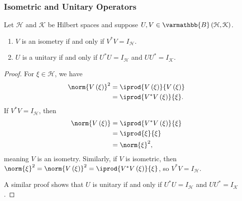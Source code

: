 \documentclass[10pt]{mypackage}
\renewcommand*{\mathbb}[1]{\varmathbb{#1}}
\newcommand{\B}{\mathbb{B}}
\begin{document}
\subsubsection{Isometric and Unitary Operators}%
\begin{lemma}
  Let $\mathcal{H}$ and $\mathcal{K}$ be Hilbert spaces and suppose $U,V\in \B\left(\mathcal{H},\mathcal{K}\right)$.
  \begin{enumerate}[(1)]
    \item $V$ is an isometry if and only if $V^{\ast}V = I_{\mathcal{H}}$.
    \item $U$ is a unitary if and only if $U^{\ast}U = I_{\mathcal{H}}$ and $UU^{\ast} = I_{\mathcal{K}}$.
  \end{enumerate}
\end{lemma}
\begin{proof}
  For $\xi\in \mathcal{H}$, we have
  \begin{align*}
    \norm{V\left(\xi\right)}^2 &= \iprod{V\left(\xi\right)}{V\left(\xi\right)}\\
                               &= \iprod{V^{\ast}V\left(\xi\right)}{\xi}.
  \end{align*}
  If $V^{\ast}V = I_{\mathcal{H}}$, then 
  \begin{align*}
    \norm{V\left(\xi\right)} &= \iprod{V^{\ast}V\left(\xi\right)}{\xi}\\
                             &= \iprod{\xi}{\xi}\\
                             &= \norm{\xi}^2,
  \end{align*}
  meaning $V$ is an isometry. Similarly, if $V$ is isometric, then $\norm{\xi}^2 = \norm{V\left(\xi\right)}^2 = \iprod{V^{\ast}V\left(\xi\right)}{\xi}$, so $V^{\ast}V = I_{\mathcal{H}}$.\newline

  A similar proof shows that $U$ is unitary if and only if $U^{\ast}U = I_{\mathcal{H}}$ and $UU^{\ast} = I_{\mathcal{K}}$.
\end{proof}
\end{document}
